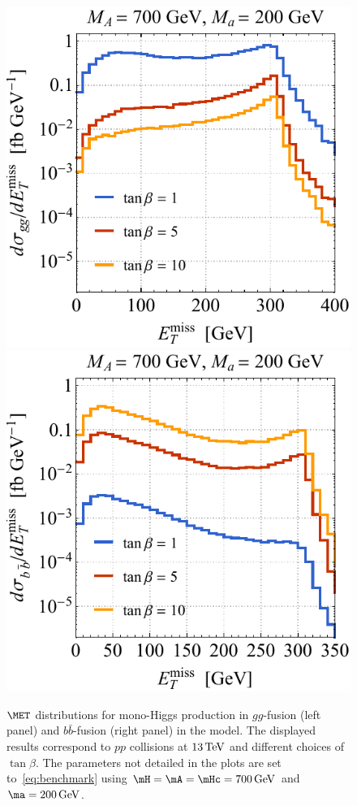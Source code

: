 \begin{figure}[t!]
\centering
\includegraphics[height=0.45\textwidth]{texinputs/04_grid/newfigures/tbl.pdf} \qquad 
\includegraphics[height=0.45\textwidth]{texinputs/04_grid/newfigures/tbr.pdf}
\vspace{2mm}
\caption{\label{fig:tbvar} 
$\MET$ distributions for mono-Higgs production in $gg$-fusion (left panel) and $b \bar b$-fusion (right panel) in the \hdma model. The displayed results correspond to $pp$ collisions at  $13 \, {\rm TeV}$ and different choices of $\tan \beta$. The parameters not detailed in the plots are set to~\eqref{eq:benchmark} using $\mH = \mA = \mHc = 700 \, {\rm GeV}$ and $\ma = 200 \, {\rm GeV}$.}
\end{figure}

